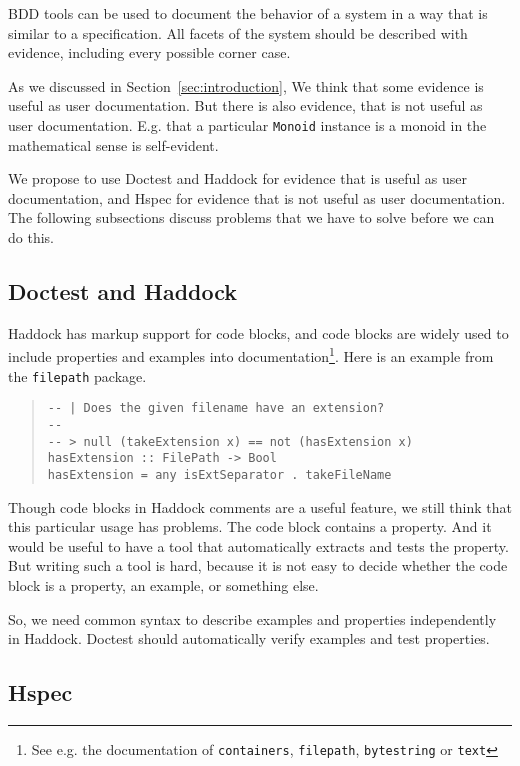 \documentclass[preprint]{sigplanconf}
\begin{document}
BDD tools can be used to document the behavior of a system in a way that
is similar to a specification.  All facets of the system should be
described with evidence, including every possible corner case.

As we discussed in Section~\ref{sec:introduction},
We think that some evidence is useful as user documentation.
But there is also evidence, that is not
useful as user documentation.  E.g. that a particular \texttt{Monoid}
instance is a monoid in the mathematical sense is self-evident.

We propose to use Doctest and Haddock for evidence that is useful as
user documentation, and Hspec for evidence that is not useful as user
documentation.  The following subsections discuss problems that we
have to solve before we can do this.

\subsection{Doctest and Haddock}
\label{sec:doctest-haddock}

Haddock has markup support for code blocks, and code blocks are widely used
to include properties and examples into documentation\footnote{
See e.g. the documentation of
{\tt containers},
{\tt filepath},
{\tt bytestring} or
{\tt text}}.
Here is an example from the {\tt filepath} package.

\begin{quote}
\small
\begin{verbatim}
-- | Does the given filename have an extension?
--
-- > null (takeExtension x) == not (hasExtension x)
hasExtension :: FilePath -> Bool
hasExtension = any isExtSeparator . takeFileName
\end{verbatim}
\end{quote}

\noindent Though code blocks in Haddock comments are a useful feature,
we still think that this particular usage has problems.  The code
block contains a property.  And it would be useful to have a tool that
automatically extracts and tests the property.
But writing such a tool is hard, because it is not easy to decide
whether the code block is a property, an example, or something else.

So, we need common syntax to describe examples and properties
independently in Haddock. Doctest should automatically verify
examples and test properties.

\subsection{Hspec}
\end{document}
